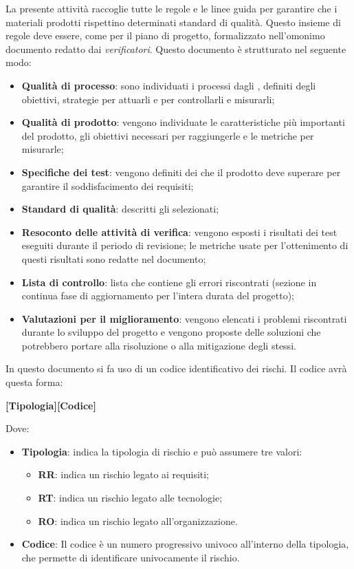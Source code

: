 La presente attività raccoglie tutte le regole e le linee guida per garantire che i materiali prodotti rispettino
determinati standard di qualità. Questo insieme di regole deve essere, come per il piano di progetto, formalizzato
nell'omonimo documento redatto dai \emph{verificatori}.
Questo documento è strutturato nel seguente modo:
\begin{itemize}
    \item \textbf{Qualità di processo}: sono individuati i processi dagli , definiti
    degli obiettivi, strategie per attuarli e  per controllarli e misurarli;
    \item \textbf{Qualità di prodotto}: vengono individuate le caratteristiche più importanti del prodotto, gli
    obiettivi necessari per raggiungerle e le metriche per misurarle;
    \item \textbf{Specifiche dei test}: vengono definiti dei  che il prodotto deve superare per
    garantire il soddisfacimento dei requisiti;
    \item \textbf{Standard di qualità}: descritti gli  selezionati;
    \item \textbf{Resoconto delle attività di verifica}: vengono esposti i risultati dei test eseguiti durante il
    periodo di revisione; le metriche usate per l'ottenimento di questi risultati sono redatte nel documento;
    \item \textbf{Lista di controllo}:  lista che contiene gli errori riscontrati (sezione in continua fase di
    aggiornamento per l'intera durata del progetto);
    \item \textbf{Valutazioni per il miglioramento}: vengono elencati i problemi riscontrati durante lo sviluppo del
    progetto e vengono proposte delle soluzioni che potrebbero portare alla risoluzione o alla mitigazione degli stessi.
\end{itemize}
In questo documento si fa uso di un codice identificativo dei rischi. Il codice avrà questa forma:
\begin{center}
	\textbf{[Tipologia][Codice]}
\end{center}
Dove:
\begin{itemize}

	\item \textbf{Tipologia}: indica la tipologia di rischio e può assumere tre valori:
	\begin{itemize}
		\item \textbf{RR}: indica un rischio legato ai requisiti;
		\item \textbf{RT}: indica un rischio legato alle tecnologie;
		\item \textbf{RO}: indica un rischio legato all'organizzazione.
	\end{itemize}
    \item \textbf{Codice}: Il codice è un numero progressivo univoco all'interno della tipologia, che permette di
    identificare univocamente il rischio.
\end{itemize}

